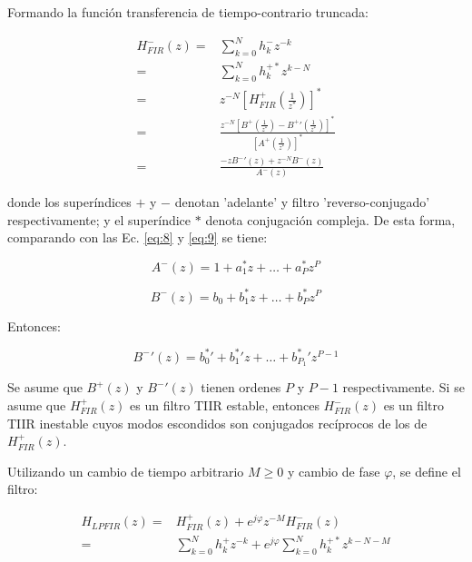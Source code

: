\documentclass[conference]{IEEEtran}
\begin{document}
Formando la función transferencia de tiempo-contrario truncada:

\begin{align}
    H_{FIR}^{-}(z) =& \sum_{k=0}^{N}{h_{k}^{-}z^{-k}} \\
                   =& \sum_{k=0}^{N}{h_{k}^{+*} z^{k-N}} \\
                   =& z^{-N} \left[ H_{FIR}^{ +} \left( \frac{1}{z^{*}} \right) \right] ^{*} \\
                   =& \frac{z^{-N} \left[ B^{ +} \left( \frac{1}{z^{*}} \right) - B^{ +}' \left( \frac{1}{z^{*}} \right)   \right] ^{*}}{\left[ A^{ + } \left( \frac{1}{z^{*}} \right) \right] ^{*}} \\
                   =& \frac{-z B^{-}' (z) + z^{-N} B^{-}(z)}{A^{-}(z)}
\end{align}

donde los superíndices \(+\) y \(-\) denotan 'adelante' y filtro 'reverso-conjugado' respectivamente; y el superíndice \(*\) denota conjugación compleja. De esta forma, comparando con las Ec. \ref{eq:8} y \ref{eq:9} se tiene:

\begin{equation}
    A^{-}(z) = 1 + a^{*}_1 z + \ldots + a^{*}_P z^P
\end{equation}

\begin{equation}
    B^{-}(z) = b_0 + b^{*}_1 z + \ldots + b^{*}_P z^P
\end{equation}

Entonces:

\begin{equation}
    B^{-}'(z) = b_0^{*}' + b_1^{*}' z + \ldots + b_{P_1}^{*}' z^{P-1}
\end{equation}

Se asume que \(B^{+}(z)\) y \(B^{-}'(z)\) tienen ordenes \(P\) y \(P-1\) respectivamente. Si se asume que \(H_{FIR}^{ +}(z)\) es un filtro TIIR estable, entonces \(H_{FIR}^{-}(z)\) es un filtro TIIR inestable cuyos modos escondidos son conjugados recíprocos de los de \(H_{FIR}^{ +}(z)\).

Utilizando un cambio de tiempo arbitrario \(M \geq 0\) y cambio de fase \(\varphi\), se define el filtro:

\begin{align}
    H_{LPFIR}(z) =& H_{FIR}^{ + } (z) + e^{j\varphi} z^{-M} H_{FIR}^{-}(z) \\
                 =& \sum_{k=0}^{N}{h_k^{ + } z^{-k}} + e^{j \varphi} \sum_{k=0}^{N}{h_k^{+*} z^{k-N-M}}
\end{align}
\end{document}
